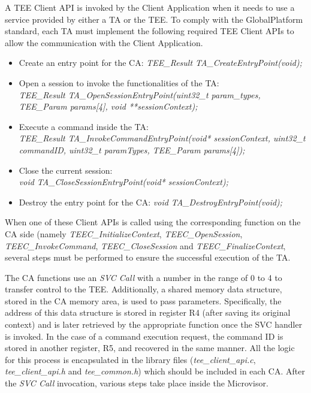 \documentclass{article}
\begin{document}
A TEE Client API is invoked by the Client Application when it needs to use a service provided by either a TA or the TEE. To comply with the GlobalPlatform standard, each TA must implement the following required TEE Client APIs to allow the communication with the Client Application.

\begin{itemize}
    \item Create an entry point for the CA: \textit{TEE\_Result TA\_CreateEntryPoint(void);}
    \item  Open a session to invoke the functionalities of the TA:\\ \textit{TEE\_Result TA\_OpenSessionEntryPoint(uint32\_t param\_types, TEE\_Param params[4], void **sessionContext);}
    \item Execute a command inside the TA:\\ \textit{TEE\_Result TA\_InvokeCommandEntryPoint(void* sessionContext, uint32\_t commandID, uint32\_t paramTypes, TEE\_Param params[4]);}
    \item Close the current session:\\ \textit{void TA\_CloseSessionEntryPoint(void* sessionContext);}
    \item Destroy the entry point for the CA: \textit{void TA\_DestroyEntryPoint(void);}
\end{itemize}

When one of these Client APIs is called using the corresponding function on the CA side (namely \textit{TEEC\_InitializeContext}, \textit{TEEC\_OpenSession}, \textit{TEEC\_InvokeCommand}, \textit{TEEC\_CloseSession} and \textit{TEEC\_FinalizeContext}, several steps must be performed to ensure the successful execution of the TA. 

The CA functions use an \textit{SVC Call} with a number in the range of 0 to 4 to transfer control to the TEE. Additionally, a shared memory data structure, stored in the CA memory area, is used to pass parameters. Specifically, the address of this data structure is stored in register R4 (after saving its original context) and is later retrieved by the appropriate function once the SVC handler is invoked. In the case of a command execution request, the command ID is stored in another register, R5, and recovered in the same manner. All the logic for this process is encapsulated in the library files (\textit{tee\_client\_api.c}, \textit{tee\_client\_api.h} and \textit{tee\_common.h}) which should be included in each CA. After the \textit{SVC Call} invocation, various steps take place inside the Microvisor.
\end{document}
